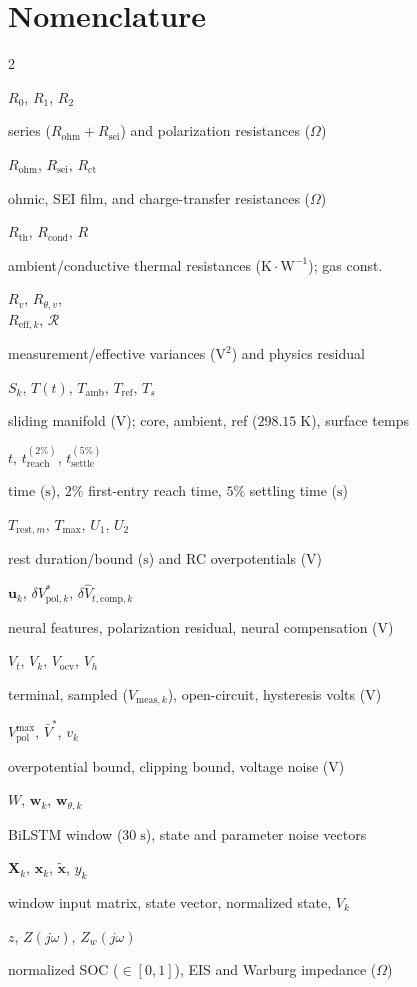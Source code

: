 \documentclass[10pt,a4paper]{article}
\newcommand{\entry}[2]{\noindent\parbox[t]{0.30\columnwidth}{\raggedright #1}\hfill\parbox[t]{0.66\columnwidth}{\raggedright #2}\par\vspace{2pt}}
\newenvironment{nomenclature}{\section*{Nomenclature}\begin{multicols}{2}\footnotesize}{\end{multicols}\vspace{0.4em}}
\begin{document}
\begin{nomenclature}
\entry{$R_0$, $R_1$, $R_2$}{series ($R_{\text{ohm}} + R_{\text{sei}}$) and polarization resistances ($\Omega$)}
\entry{$R_{\text{ohm}}$, $R_{\text{sei}}$, $R_{\text{ct}}$}{ohmic, SEI film, and charge-transfer resistances ($\Omega$)}
\entry{$R_{\text{th}}$, $R_{\text{cond}}$, $R$}{ambient/conductive thermal resistances ($\text{K}\cdot\text{W}^{-1}$); gas const.}
\entry{$R_v$, $R_{\theta,v}$,\\ $R_{\text{eff},k}$, $\mathcal{R}$}{measurement/effective variances ($\text{V}^2$) and physics residual}
\entry{$S_k$, $T(t)$, $T_{\text{amb}}$, $T_{\text{ref}}$, $T_s$}{sliding manifold ($\text{V}$); core, ambient, ref ($298.15\;\text{K}$), surface temps}
\entry{$t$, $t_{\text{reach}}^{(2\%)}$, $t_{\text{settle}}^{(5\%)}$}{time ($\text{s}$), $2\%$ first-entry reach time, $5\%$ settling time ($\text{s}$)}
\entry{$T_{\text{rest},m}$, $T_{\max}$, $U_1$, $U_2$}{rest duration/bound ($\text{s}$) and RC overpotentials ($\text{V}$)}
\entry{$\mathbf{u}_k$, $\delta V_{\text{pol},k}^*$, $\delta\hat{V}_{t,\text{comp},k}$}{neural features, polarization residual, neural compensation ($\text{V}$)}
\entry{$V_t$, $V_k$, $V_{\text{ocv}}$, $V_h$}{terminal, sampled ($V_{\text{meas},k}$), open-circuit, hysteresis volts ($\text{V}$)}
\entry{$V_{\text{pol}}^{\max}$, $\bar{V}^*$, $v_k$}{overpotential bound, clipping bound, voltage noise ($\text{V}$)}
\entry{$W$, $\mathbf{w}_k$, $\mathbf{w}_{\theta,k}$}{BiLSTM window ($30\;\text{s}$), state and parameter noise vectors}
\entry{$\mathbf{X}_k$, $\mathbf{x}_k$, $\tilde{\mathbf{x}}$, $y_k$}{window input matrix, state vector, normalized state, $V_k$}
\entry{$z$, $Z(j\omega)$, $Z_w(j\omega)$}{normalized SOC ($\in [0, 1]$), EIS and Warburg impedance ($\Omega$)}


\end{nomenclature}
\end{document}
